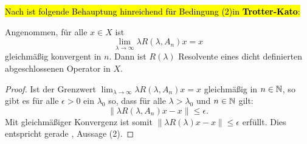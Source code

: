 
\hl{Nach ist folgende Behauptung hinreichend für Bedingung (2)in \textbf{Trotter-Kato}:}

\begin{folg}\label{Hinreichende Bedingung für Trotter-Kato}
Angenommen, für alle $x\in X$ ist 
\begin{equation*}
\lim_{\lambda\to\infty}\lambda R(\lambda, A_n)x=x
\end{equation*}
gleichmäßig konvergent in $n$. Dann ist $R(\lambda)$ Resolvente eines dicht definierten abgeschlossenen Operator in $X$.
\end{folg}

\begin{proof}
Ist der Grenzwert $\lim_{\lambda\to\infty}\lambda R(\lambda, A_n)x=x$ gleichmäßig in $n\in\mathbb{N}$, so gibt es für alle $\epsilon>0$  ein $\lambda_0$ so, dass für alle $\lambda > \lambda_0$ und $n\in\mathbb{N}$ gilt:
\begin{equation*}
\|\lambda R(\lambda, A_n)x-x\|\leq \epsilon.
\end{equation*}
Mit gleichmäßiger Konvergenz ist somit $\|\lambda R(\lambda)x-x\|\leq \epsilon$ erfüllt. Dies entspricht gerade \Cref{}, Aussage (2).
\end{proof}




